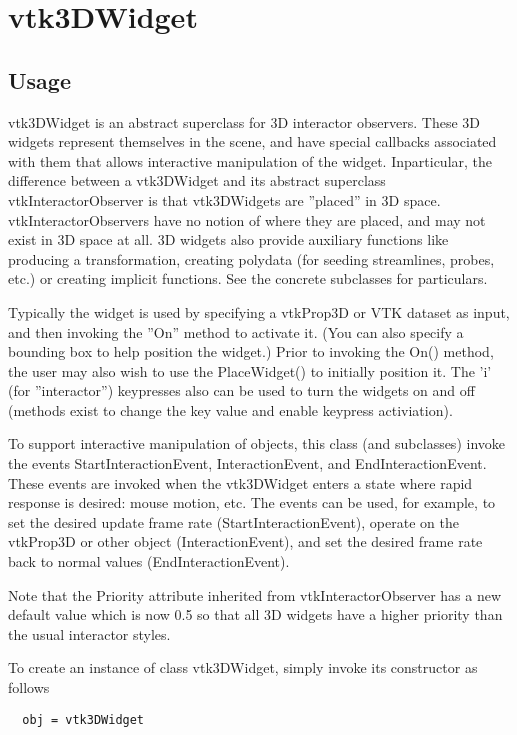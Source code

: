 \section{vtk3DWidget}

\subsection{Usage}

 vtk3DWidget is an abstract superclass for 3D interactor observers. These
 3D widgets represent themselves in the scene, and have special callbacks
 associated with them that allows interactive manipulation of the widget.
 Inparticular, the difference between a vtk3DWidget and its abstract
 superclass vtkInteractorObserver is that vtk3DWidgets are ''placed'' in 3D
 space.  vtkInteractorObservers have no notion of where they are placed,
 and may not exist in 3D space at all.  3D widgets also provide auxiliary
 functions like producing a transformation, creating polydata (for seeding
 streamlines, probes, etc.) or creating implicit functions. See the
 concrete subclasses for particulars.

 Typically the widget is used by specifying a vtkProp3D or VTK dataset as
 input, and then invoking the ''On'' method to activate it. (You can also
 specify a bounding box to help position the widget.) Prior to invoking the
 On() method, the user may also wish to use the PlaceWidget() to initially
 position it. The 'i' (for ''interactor'') keypresses also can be used to
 turn the widgets on and off (methods exist to change the key value
 and enable keypress activiation).
 
 To support interactive manipulation of objects, this class (and
 subclasses) invoke the events StartInteractionEvent, InteractionEvent, and
 EndInteractionEvent.  These events are invoked when the vtk3DWidget enters
 a state where rapid response is desired: mouse motion, etc. The events can
 be used, for example, to set the desired update frame rate
 (StartInteractionEvent), operate on the vtkProp3D or other object
 (InteractionEvent), and set the desired frame rate back to normal values
 (EndInteractionEvent).

 Note that the Priority attribute inherited from vtkInteractorObserver has
 a new default value which is now 0.5 so that all 3D widgets have a higher
 priority than the usual interactor styles.


To create an instance of class vtk3DWidget, simply
invoke its constructor as follows
\begin{verbatim}
  obj = vtk3DWidget
\end{verbatim}
